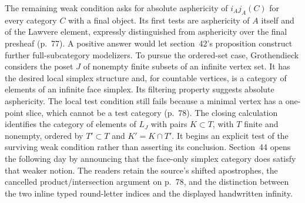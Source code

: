 The remaining weak condition asks for absolute asphericity of $i_Aj_A(C)$ for every category $C$ with a final object. Its first tests are asphericity of $A$ itself and of the Lawvere element, expressly distinguished from asphericity over the final presheaf (p.~77). A positive answer would let section~42's proposition construct further full-subcategory modelizers. To pursue the ordered-set case, Grothendieck considers the poset $J$ of nonempty finite subsets of an infinite vertex set. It has the desired local simplex structure and, for countable vertices, is a category of elements of an infinite face simplex. Its filtering property suggests absolute asphericity. The local test condition still fails because a minimal vertex has a one-point slice, which cannot be a test category (p.~78). The closing calculation identifies the category of elements of $L_J$ with pairs $K\subset T$, with $T$ finite and nonempty, ordered by $T'\subset T$ and $K'=K\cap T'$. It begins an explicit test of the surviving weak condition rather than asserting its conclusion. Section~44 opens the following day by announcing that the face-only simplex category does satisfy that weaker notion. The readers retain the source's shifted apostrophes, the cancelled product/intersection argument on p.~78, and the distinction between the two inline typed round-letter indices and the displayed handwritten infinity.

